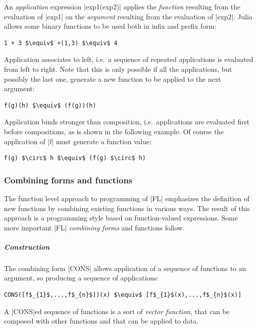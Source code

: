  An \emph{application} expression |exp1(exp2)| applies the 
\emph{function} resulting from the evaluation of |exp1| on the 
\emph{argument} resulting from the evaluation of |exp2|.  Julia 
allows some binary functions to be used both in infix and prefix form:
\begin{lstlisting}[language=JuliaLocal, style=julia, mathescape = true]
1 + 3 $\equiv$ +(1,3) $\equiv$ 4
\end{lstlisting}

 Application associates to left, i.e.~a sequence of repeated 
applications is evaluated from left to right. Note that this is only 
possible if all the applications, but possibly the last one, generate a 
new function to be applied to the next argument:
\begin{lstlisting}[language=JuliaLocal, style=julia, mathescape = true]
f(g)(h) $\equiv$ (f(g))(h)
\end{lstlisting}

 Application binds stronger than composition, i.e.~applications 
are evaluated first before compositions, as is shown in the 
following example.  Of course the application of |f| must generate a function value:
\begin{lstlisting}[language=JuliaLocal, style=julia, mathescape = true]
f(g) $\circ$ h $\equiv$ (f(g) $\circ$ h)
\end{lstlisting}


\subsubsection*{Combining forms and functions}
\label{subsec:2:forms}

The function level approach to programming of |FL| emphasizes the
definition of new functions by combining existing functions in various
ways.  The result of this approach is a programming style based on
function-valued expressions.  Some more important |FL| \emph{combining
forms} and functions follow.

\subparagraph{Construction}

The combining form |CONS| allows application of a sequence
of functions to an argument, so producing a sequence of applications:  
\begin{lstlisting}[language=JuliaLocal, style=julia, mathescape = true]
CONS([f$_{1}$,...,f$_{n}$])(x) $\equiv$ [f$_{1}$(x),...,f$_{n}$(x)]
\end{lstlisting}
A |CONS|ed sequence of functions is a sort of \emph{vector function},
that can be composed with other functions and that can be applied to
data.  

